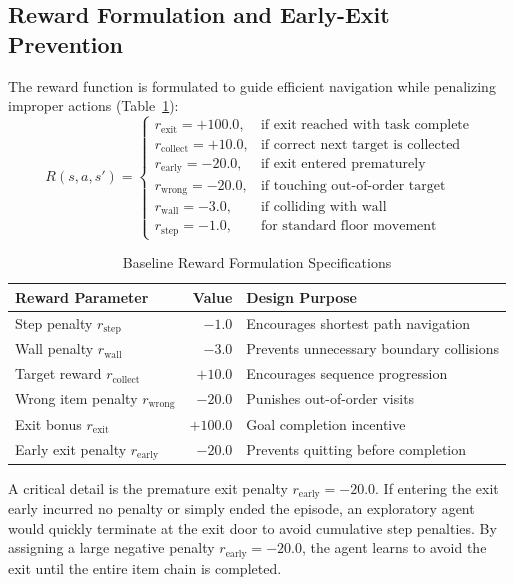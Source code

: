 \documentclass[10pt,conference]{IEEEtran}
\begin{document}
\subsection{Reward Formulation and Early-Exit Prevention}
The reward function is formulated to guide efficient navigation while penalizing improper actions (Table~\ref{tab:rewards}):
\begin{equation}
    R(s, a, s') = 
    \begin{cases}
        r_{\text{exit}} = +100.0, & \text{if exit reached with task complete} \\
        r_{\text{collect}} = +10.0, & \text{if correct next target is collected} \\
        r_{\text{early}} = -20.0, & \text{if exit entered prematurely} \\
        r_{\text{wrong}} = -20.0, & \text{if touching out-of-order target} \\
        r_{\text{wall}} = -3.0, & \text{if colliding with wall} \\
        r_{\text{step}} = -1.0, & \text{for standard floor movement}
    \end{cases}
\end{equation}

\begin{table}[htbp]
\caption{Baseline Reward Formulation Specifications}
\label{tab:rewards}
\centering
\begin{tabular}{lrl}
\toprule
\textbf{Reward Parameter} & \textbf{Value} & \textbf{Design Purpose} \\
\midrule
Step penalty $r_{\text{step}}$ & $-1.0$ & Encourages shortest path navigation \\
Wall penalty $r_{\text{wall}}$ & $-3.0$ & Prevents unnecessary boundary collisions \\
Target reward $r_{\text{collect}}$ & $+10.0$ & Encourages sequence progression \\
Wrong item penalty $r_{\text{wrong}}$ & $-20.0$ & Punishes out-of-order visits \\
Exit bonus $r_{\text{exit}}$ & $+100.0$ & Goal completion incentive \\
Early exit penalty $r_{\text{early}}$ & $-20.0$ & Prevents quitting before completion \\
\bottomrule
\end{tabular}
\end{table}

A critical detail is the premature exit penalty $r_{\text{early}} = -20.0$. If entering the exit early incurred no penalty or simply ended the episode, an exploratory agent would quickly terminate at the exit door to avoid cumulative step penalties. By assigning a large negative penalty $r_{\text{early}} = -20.0$, the agent learns to avoid the exit until the entire item chain is completed.
\end{document}
